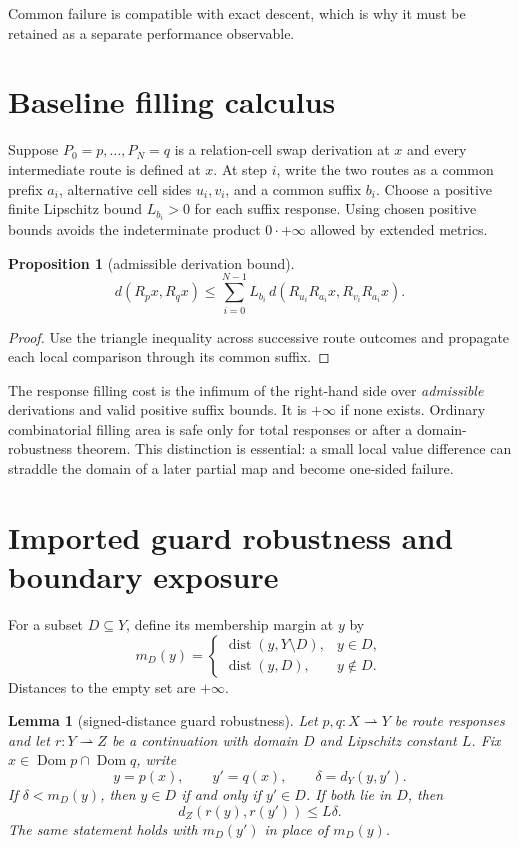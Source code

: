 \documentclass[11pt]{article}
\newtheorem{proposition}[theorem]{Proposition}
\newtheorem{lemma}[theorem]{Lemma}
\theoremstyle{definition}
\theoremstyle{remark}
\newcommand{\Dom}{\operatorname{Dom}}
\newcommand{\dist}{\operatorname{dist}}
\begin{document}
Common failure is compatible with exact descent, which is why it must be
retained as a separate performance observable.

\section{Baseline filling calculus}
\label{sec:filling}

Suppose \(P_0=p,\ldots,P_N=q\) is a relation-cell swap derivation at \(x\) and
every intermediate route is defined at \(x\). At step \(i\), write the two
routes as a common prefix \(a_i\), alternative cell sides \(u_i,v_i\), and a
common suffix \(b_i\). Choose a positive finite Lipschitz bound
\(L_{b_i}>0\) for each suffix response. Using chosen positive bounds avoids
the indeterminate product \(0\cdot+\infty\) allowed by extended metrics.

\begin{proposition}[admissible derivation bound]
\label{prop:filling}
\[
d(R_px,R_qx)\le
\sum_{i=0}^{N-1}
L_{b_i}\,
d(R_{u_i}R_{a_i}x,R_{v_i}R_{a_i}x).
\]
\end{proposition}

\begin{proof}
Use the triangle inequality across successive route outcomes and propagate
each local comparison through its common suffix.
\end{proof}

The response filling cost is the infimum of the right-hand side over
\emph{admissible} derivations and valid positive suffix bounds. It is
\(+\infty\) if none exists. Ordinary combinatorial filling area is safe only
for total responses or after a domain-robustness theorem. This distinction is
essential: a small local value difference can straddle the domain of a later
partial map and become one-sided failure.

\section{Imported guard robustness and boundary exposure}
\label{sec:seam}

For a subset \(D\subseteq Y\), define its membership margin at \(y\) by
\[
m_D(y)=
\begin{cases}
\dist(y,Y\setminus D),&y\in D,\\
\dist(y,D),&y\notin D.
\end{cases}
\]
Distances to the empty set are \(+\infty\).

\begin{lemma}[signed-distance guard robustness]
\label{thm:seam}
Let \(p,q:X\rightharpoonup Y\) be route responses and let
\(r:Y\rightharpoonup Z\) be a continuation with domain \(D\) and Lipschitz
constant \(L\). Fix \(x\in\Dom p\cap\Dom q\), write
\[
y=p(x),\qquad y'=q(x),\qquad\delta=d_Y(y,y').
\]
If \(\delta<m_D(y)\), then \(y\in D\) if and only if \(y'\in D\).
If both lie in \(D\), then
\[
d_Z(r(y),r(y'))\le L\delta.
\]
The same statement holds with \(m_D(y')\) in place of \(m_D(y)\).
\end{lemma}
\end{document}
